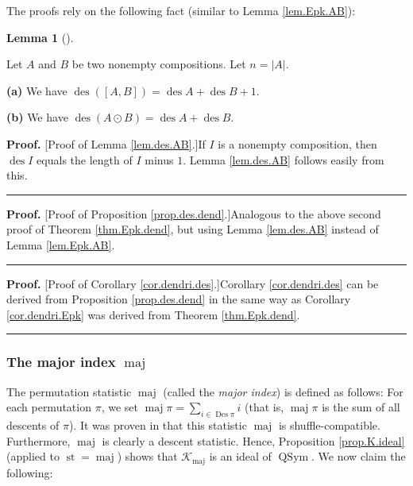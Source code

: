 \documentclass[numbers=enddot,12pt,final,onecolumn,notitlepage]{scrartcl}%
\theoremstyle{definition}
\newtheorem{lem}[theo]{Lemma}
\newenvironment{lemma}[1][]
{\begin{lem}[#1]\begin{leftbar}}
{\end{leftbar}\end{lem}}
\newenvironment{proof}[1][Proof]{\noindent\textbf{#1.} }{\ \rule{0.5em}{0.5em}}
\let\sumnonlimits\sum
\renewcommand{\sum}{\sumnonlimits\limits}
\begin{document}
The proofs rely on the following fact (similar to Lemma \ref{lem.Epk.AB}):

\begin{lemma}
\label{lem.des.AB}Let $A$ and $B$ be two nonempty compositions. Let
$n=\left\vert A\right\vert $.

\textbf{(a)} We have $\operatorname*{des}\left(  \left[  A,B\right]  \right)
=\operatorname*{des}A+\operatorname*{des}B+1$.

\textbf{(b)} We have $\operatorname*{des}\left(  A\odot B\right)
=\operatorname*{des}A+\operatorname*{des}B$.
\end{lemma}

\begin{proof}
[Proof of Lemma \ref{lem.des.AB}.]If $I$ is a nonempty composition, then
$\operatorname*{des}I$ equals the length of $I$ minus $1$. Lemma
\ref{lem.des.AB} follows easily from this.
\end{proof}

\begin{proof}
[Proof of Proposition \ref{prop.des.dend}.]Analogous to the above second proof
of Theorem \ref{thm.Epk.dend}, but using Lemma \ref{lem.des.AB} instead of
Lemma \ref{lem.Epk.AB}.
\end{proof}

\begin{proof}
[Proof of Corollary \ref{cor.dendri.des}.]Corollary \ref{cor.dendri.des} can
be derived from Proposition \ref{prop.des.dend} in the same way as Corollary
\ref{cor.dendri.Epk} was derived from Theorem \ref{thm.Epk.dend}.
\end{proof}

\subsubsection{The major index $\operatorname*{maj}$}

The permutation statistic $\operatorname*{maj}$ (called the \textit{major
index}) is defined as follows: For each permutation $\pi$, we set
$\operatorname*{maj}\pi=\sum_{i\in\operatorname*{Des}\pi}i$ (that is,
$\operatorname*{maj}\pi$ is the sum of all descents of $\pi$). It was proven
in \cite[Theorem 3.1 \textbf{(a)}]{part1} that this statistic
$\operatorname*{maj}$ is shuffle-compatible. Furthermore, $\operatorname*{maj}%
$ is clearly a descent statistic. Hence, Proposition \ref{prop.K.ideal}
(applied to $\operatorname*{st}=\operatorname*{maj}$) shows that
$\mathcal{K}_{\operatorname*{maj}}$ is an ideal of $\operatorname*{QSym}$. We
now claim the following:
\end{document}
